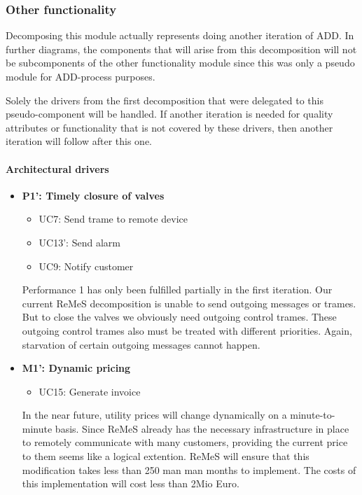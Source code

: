\subsubsection{Other functionality}
Decomposing this module actually represents doing another iteration of ADD.
In further diagrams, the components that will arise from this decomposition will not
be subcomponents of the other functionality module since this was only a pseudo module
for ADD-process purposes.

Solely the drivers from the first decomposition that were delegated to this pseudo-component will be handled. If another iteration is needed for quality attributes or functionality that is not covered by these drivers, then another iteration will follow after this one.


\paragraph{Architectural drivers}
\begin{itemize}
	\item \textbf{P1': Timely closure of valves}
	\begin{itemize}
		\item UC7: Send trame to remote device
		\item UC13': Send alarm
		\item UC9: Notify customer
	\end{itemize}
	Performance 1 has only been fulfilled partially in the first iteration. Our current ReMeS decomposition
		is unable to send outgoing messages or trames. But to close the valves we obviously
		need outgoing control trames. These outgoing control trames also must be treated
		with different priorities. Again, starvation of certain outgoing messages cannot happen.
	
	\item \textbf{M1': Dynamic pricing}
	\begin{itemize}
		\item UC15: Generate invoice
	\end{itemize}
	In the near future, utility prices will change dynamically on a minute-to-minute basis.
		Since ReMeS already has the necessary infrastructure in place to remotely communicate with
		many customers, providing the current price to them seems like a logical extention.
		ReMeS will ensure that this modification takes less than 250 man man months to implement.
		The costs of this implementation will cost less than 2Mio Euro.
\end{itemize}



